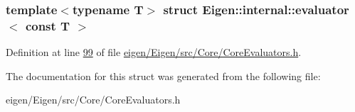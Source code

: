 \subsubsection*{template$<$typename T$>$\newline
struct Eigen\+::internal\+::evaluator$<$ const T $>$}



Definition at line \hyperlink{eigen_2_eigen_2src_2_core_2_core_evaluators_8h_source_l00099}{99} of file \hyperlink{eigen_2_eigen_2src_2_core_2_core_evaluators_8h_source}{eigen/\+Eigen/src/\+Core/\+Core\+Evaluators.\+h}.



The documentation for this struct was generated from the following file\+:\begin{DoxyCompactItemize}
\item 
eigen/\+Eigen/src/\+Core/\+Core\+Evaluators.\+h\end{DoxyCompactItemize}
